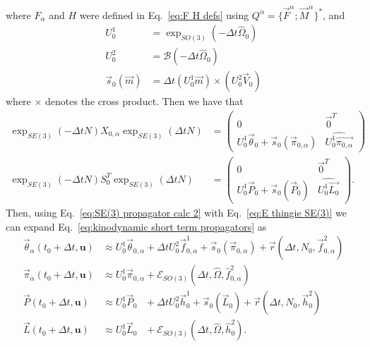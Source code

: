 \documentclass[]{cam-thesis}
\begin{document}
where $F_\alpha$ and $H$ were defined in Eq.~\ref{eq:F H defs} using $Q^\alpha = \{ \vec{F}^\alpha ; \vec{M}^\alpha \}^*$, and
\begin{subequations}
	\begin{align}
		U^1_0 & = \exp_{SO(3)}(-\Delta t \hat{\Omega}_0) \\
		U^2_0 & = \mathscr{B}(- \Delta t \hat{\Omega}_0) \\
		\vec{s}_0(\vec{m}) & = \Delta t (U^1_0 \vec{m}) \times \left( U_0^2 \vec{V}_0 \right)
	\end{align}
\end{subequations}
where $\times$ denotes the cross product. Then we have that
\begin{subequations} \label{eq:SE(3) propagator calc 2}
\begin{align}
	\exp_{SE(3)}(-\Delta t N) X_{0,\alpha} \exp_{SE(3)}(\Delta t N) & = \begin{pmatrix}
		0 & \vec{0}^T \\
		U_0^1 \vec{\theta}_0 + \vec{s}_0(\vec{\pi}_{0,\alpha}) & \widehat{ U_0^1 \vec{\pi_{0,\alpha}} }
	\end{pmatrix} \\
	\exp_{SE(3)}(-\Delta t N) S_0^T \exp_{SE(3)}(\Delta t N) & = \begin{pmatrix}
		0 & \vec{0}^T \\
		U_0^1 \vec{P}_0 + \vec{s}_0(\vec{P}_0) & \widehat{ U_0^1 \vec{L_0} }	
	\end{pmatrix}.
\end{align}
\end{subequations}
Then, using Eq.~\ref{eq:SE(3) propagator calc 2} with Eq.~\ref{eq:E thingie SE(3)} we can expand Eq.~\ref{eq:kinodynamic short term propagators} as
\begin{subequations}
	\begin{align}
	\vec{\theta}_\alpha(t_0 + \Delta t, \mathbf{u}) & \approx U_0^1 \vec{\theta}_{0,\alpha} + \Delta t U_0^2 \vec{f}_{0,\alpha}^1 + \vec{s}_0(\vec{\pi}_{0,\alpha}) + \vec{r}(\Delta t, N_0, \vec{f}_{0,\alpha}^2) \\
	\vec{\pi}_\alpha(t_0 + \Delta t, \mathbf{u}) & \approx U_0^1 \vec{\pi}_{0,\alpha} + \mathscr{E}_{SO(3)}(\Delta t, \hat{\Omega}, \hat{f}_{0,\alpha}^2) \\
	\vec{P}(t_0 + \Delta t, \mathbf{u}) & \approx U_0^1 \vec{P}_{0\phantom{,\alpha}} + \Delta t U_0^2 \vec{h}_0^1 + \vec{s}_0(\vec{L}_0) + \vec{r}(\Delta t, N_0, \vec{h}_0^2) \\
	\vec{L}(t_0 + \Delta t, \mathbf{u}) & \approx U_0^1 \vec{L}_{0\phantom{,\alpha}} + \mathscr{E}_{SO(3)}(\Delta t, \hat{\Omega}, \hat{h}_0^2).
	\end{align}
\end{subequations} 
\end{document}
